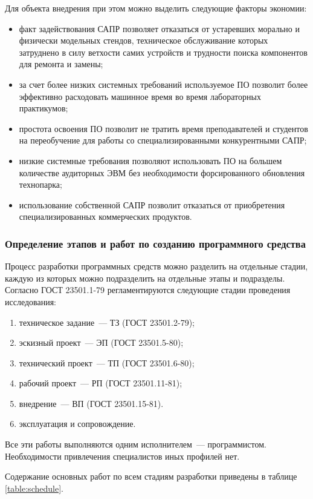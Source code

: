Для объекта внедрения при этом можно выделить следующие факторы экономии:
\begin{itemize}
  \item факт задействования САПР позволяет отказаться от устаревших морально и физически модельных стендов, техническое обслуживание которых затруднено в силу ветхости самих устройств и трудности поиска компонентов для ремонта и замены;
  \item за счет более низких системных требований используемое ПО позволит более эффективно расходовать машинное время во время лабораторных практикумов;
  \item простота освоения ПО позволит не тратить время преподавателей и студентов на переобучение для работы со специализированными конкурентными САПР;
  \item низкие системные требования позволяют использовать ПО на большем количестве аудиторных ЭВМ без необходимости форсированного обновления технопарка;
  \item использование собственной САПР позволит отказаться от приобретения специализированных коммерческих продуктов.
\end{itemize}

\subsubsection{Определение этапов и работ по созданию программного средства}
Процесс разработки программных средств можно разделить на отдельные стадии, каждую из которых можно подразделить на отдельные этапы и подразделы.
Согласно ГОСТ 23501.1-79 регламентируются следующие стадии проведения исследования:
\begin{enumerate}
  \item техническое задание~--- ТЗ (ГОСТ 23501.2-79);
  \item эскизный проект~--- ЭП (ГОСТ 23501.5-80);
  \item технический проект~--- ТП (ГОСТ 23501.6-80);
  \item рабочий проект~--- РП (ГОСТ 23501.11-81);
  \item внедрение~--- ВП (ГОСТ 23501.15-81).
  \item эксплуатация и сопровождение.
\end{enumerate}

Все эти работы выполняются одним исполнителем~--- программистом.
Необходимости привлечения специалистов иных профилей нет.

Содержание основных работ по всем стадиям разработки приведены в таблице \ref{table:schedule}.

